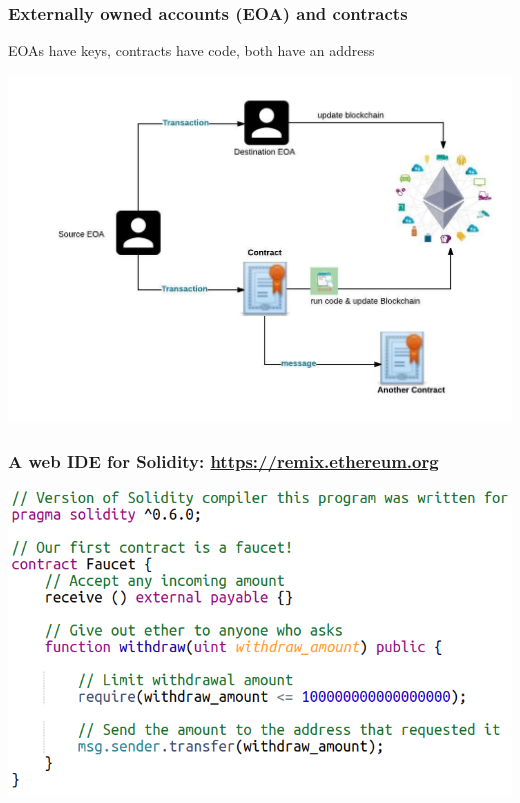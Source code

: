 \documentclass[11pt]{beamer}  %
\begin{document}
\begin{frame}\frametitle{Externally owned accounts (EOA) and contracts}

  \begin{greenbox}{}
    EOAs have keys, contracts have code, both have an address
  \end{greenbox}
  
  \begin{center}
    \includegraphics[scale=0.35,clip=false]{pictures/eoa-contract.jpg}
  \end{center}

\end{frame}

\begin{frame}\frametitle{A web IDE for Solidity: \url{https://remix.ethereum.org}}

  \begin{center}
    \includegraphics[scale=0.47,clip=false]{pictures/faucet_sol.png}
  \end{center}

\end{frame}
\end{document}
